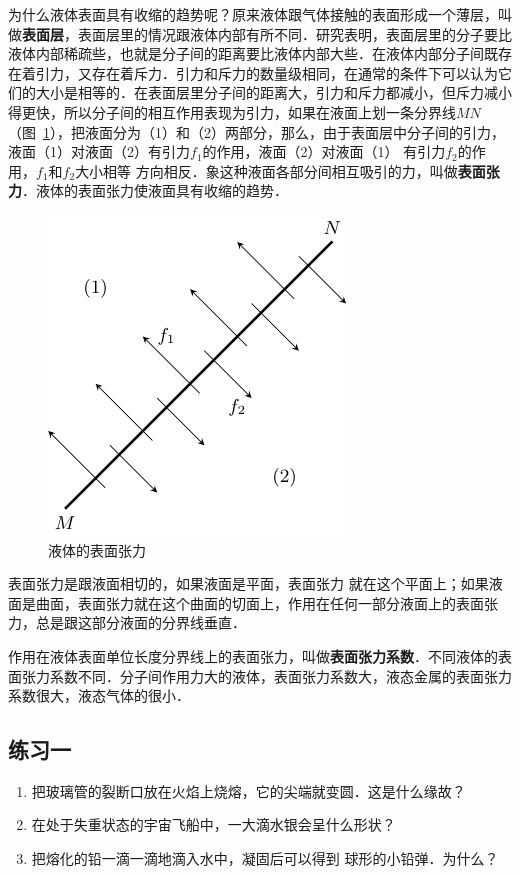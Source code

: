 为什么液体表面具有收缩的趋势呢？原来液体跟气体接触的表面形成一个薄层，叫做\textbf{表面层}，表面层里的情况跟液体内部有所不同．研究表明，表面层里的分子要比液体内部稀疏些，也就是分子间的距离要比液体内部大些．在液体内部分子间既存在着引力，又存在着斥力．引力和斥力的数量级相同，在通常的条件下可以认为它们的大小是相等的．在表面层里分子间的距离大，引力和斥力都减小，但斥力减小得更快，所以分子间的相互作用表现为引力，如果在液面上划一条分界线$MN$（图~\ref{fig_B_4-11}），把液面分为（1）和（2）两部分，那么，由于表面层中分子间的引力，液面（1）对液面（2）有引力$f_1$的作用，液面（2）对液面（1）
有引力$f_2$的作用，$f_1$和$f_2$大小相等
方向相反．象这种液面各部分间相互吸引的力，叫做\textbf{表面张力}．液体的表面张力使液面具有收缩的趋势．
\begin{figure}[htbp]
    \centering
    \includegraphics{fig/B/4-11.pdf}
    \caption{液体的表面张力}\label{fig_B_4-11}
\end{figure}

表面张力是跟液面相切的，如果液面是平面，表面张力
就在这个平面上；如果液面是曲面，表面张力就在这个曲面的切面上，作用在任何一部分液面上的表面张力，总是跟这部分液面的分界线垂直．

作用在液体表面单位长度分界线上的表面张力，叫做\textbf{表面张力系数}．不同液体的表面张力系数不同．分子间作用力大的液体，表面张力系数大，液态金属的表面张力系数很大，液态气体的很小．

\subsection*{练习一}
\begin{enumerate}
\item 把玻璃管的裂断口放在火焰上烧熔，它的尖端就变圆．这是什么缘故？
\item 在处于失重状态的宇宙飞船中，一大滴水银会呈什么形状？
\item 把熔化的铅一滴一滴地滴入水中，凝固后可以得到
球形的小铅弹．为什么？
\end{enumerate}

